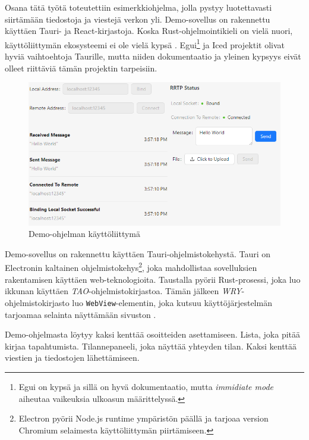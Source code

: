\documentclass[a4paper,12pt]{article}
\begin{document}
    Osana tätä työtä toteutettiin esimerkkiohjelma, jolla pystyy luotettavasti siirtämään tiedostoja ja viestejä verkon yli. Demo-sovellus on rakennettu käyttäen Tauri- ja React-kirjastoja. Koska Rust-ohjelmointikieli on vielä nuori, käyttöliittymän ekosysteemi ei ole vielä kypsä \cite{AreYet}. 
    Egui\footnote{Egui on kypsä ja sillä on hyvä dokumentaatio, mutta \textit{immidiate mode} aiheutaa vaikeuksia ulkoasun määrittelyssä. } ja Iced projektit olivat hyviä vaihtoehtoja Taurille, mutta niiden dokumentaatio ja yleinen kypsyys eivät olleet riittäviä tämän projektin tarpeisiin. \par

    \begin{figure}[h!]
        \centering
        \includegraphics[width=\textwidth]{doc/latex/src/images/RRTP.png}
        \caption{Demo-ohjelman käyttöliittymä}
        \label{fig:demo_interface}
    \end{figure}

    Demo-sovellus on rakennettu käyttäen Tauri-ohjelmistokehystä.
    Tauri on Electronin kaltainen ohjelmistokehys\footnote{Electron pyörii Node.js runtime ympäristön päällä ja tarjoaa version Chromium selaimesta käyttöliittymän piirtämiseen.}, joka mahdollistaa sovelluksien rakentamisen käyttäen web-teknologioita. Taustalla pyörii Rust-prosessi, joka luo ikkunan käyttäen \textit{TAO}-ohjelmistokirjastoa. Tämän jälkeen \textit{WRY}-ohjelmistokirjasto luo \lstinline{WebView}-elementin, joka kutsuu käyttöjärjestelmän tarjoamaa selainta näyttämään sivuston \cite{tauri-app}.

    Demo-ohjelmasta löytyy kaksi kenttää osoitteiden asettamiseen. Lista, joka
    pitää kirjaa tapahtumista. Tilannepaneeli, joka näyttää yhteyden tilan.
    Kaksi kenttää viestien ja tiedostojen lähettämiseen. \par
\end{document}
